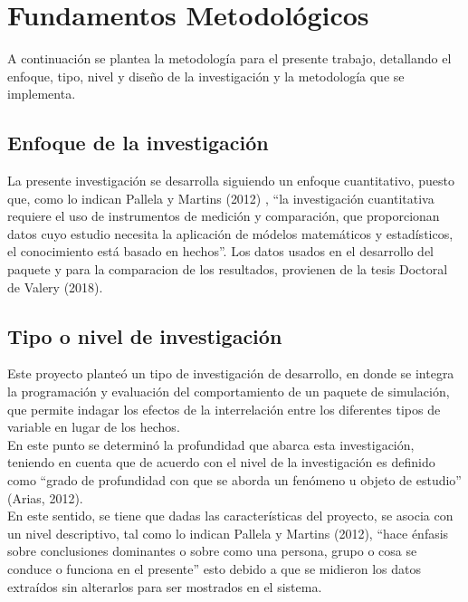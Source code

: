 \chapter{Fundamentos Metodol\'ogicos}

	A continuaci\'on se plantea la metodolog\'ia para el presente trabajo, detallando el enfoque, tipo, nivel y dise\~no de la investigaci\'on y la metodolog\'ia que se implementa.
	
\section{Enfoque de la investigaci\'on}
	
	La presente investigaci\'on se desarrolla siguiendo un enfoque cuantitativo, puesto que, como lo indican Pallela y  Martins (2012) , “la investigaci\'on cuantitativa requiere el uso de instrumentos de medici\'on y comparaci\'on, que proporcionan datos cuyo estudio necesita la aplicaci\'on de m\'odelos matem\'aticos y estad\'isticos, el conocimiento est\'a basado en hechos”.  Los datos usados en el desarrollo del paquete y para la comparacion de los resultados, provienen de la tesis Doctoral de Valery (2018).\\
	
\section{Tipo o nivel de investigaci\'on}
	
	Este proyecto plante\'o un tipo de investigaci\'on de desarrollo, en donde se integra la programaci\'on y evaluaci\'on del comportamiento de un paquete de simulaci\'on, que permite indagar los efectos de la interrelaci\'on entre los diferentes tipos de variable en lugar de los hechos.\\

	En este punto se determin\'o la profundidad que abarca esta investigaci\'on, teniendo en cuenta que de acuerdo con  el nivel de la investigaci\'on es definido como “grado de profundidad con que se aborda un fen\'omeno u objeto de estudio” (Arias, 2012).\\

	En este sentido, se tiene que dadas las caracter\'isticas del proyecto, se asocia con un nivel descriptivo, tal como lo indican Pallela y  Martins (2012),  “hace \'enfasis sobre conclusiones dominantes o sobre como una persona, grupo o cosa se conduce o funciona en el presente” esto debido a que se midieron los datos extra\'idos sin alterarlos para ser mostrados en el sistema.\\

